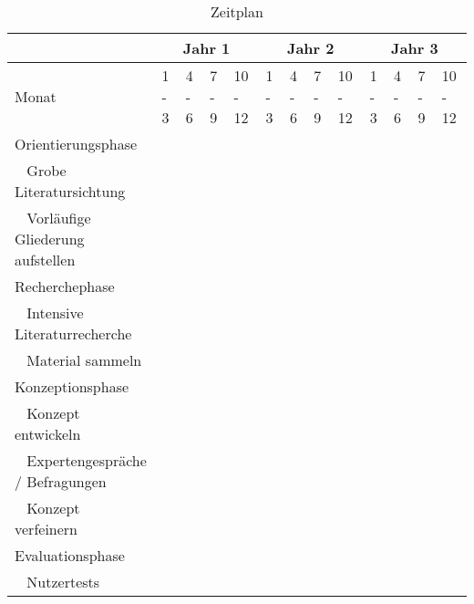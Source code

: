 \begin{landscape}
    \begin{table}
        \centering
        \caption{Zeitplan}
        \begin{tabular}{|l|l|l|l|l|l|l|l|l|l|l|l|l|}
        \hline
            & \multicolumn{4}{c|}{Jahr 1}  & \multicolumn{4}{c|}{Jahr 2} & \multicolumn{4}{c|}{Jahr 3} \\ \hline
            Monat  & 1 - 3 & 4 - 6 & 7 - 9 & 10 - 12 & 1 - 3 & 4 - 6 & 7 - 9 & 10 - 12 & 1 - 3 & 4 - 6 & 7 - 9 & 10 - 12 \\ \hline
            \cellcolor{yellow!75}Orientierungsphase & \cellcolor{yellow!75} & \cellcolor{yellow!75} &  &  &  &  &  &  &  &  &  &  \\ \hline
            ~ Grobe Literatursichtung  & \cellcolor{yellow!35} &  &  &  &  &  &  &  &  &  &  &  \\ \hline
            ~ Vorläufige Gliederung aufstellen  & \cellcolor{yellow!35} & \cellcolor{yellow!35} &  &  &  &  &  &  &  &  &  &  \\ \hline
            \cellcolor{yellow!75}Recherchephase  &  & \cellcolor{yellow!75} & \cellcolor{yellow!75} & \cellcolor{yellow!75} &  &  &  &  &  &  &  &  \\ \hline
            ~ Intensive Literaturrecherche  &  & \cellcolor{yellow!35} & \cellcolor{yellow!35} &  &  &  &  &  &  &  &  &  \\ \hline
            ~ Material sammeln  &  &  & \cellcolor{yellow!35} & \cellcolor{yellow!35}  &  &  &  &  &  &  &  &  \\ \hline
            \cellcolor{yellow!75}Konzeptionsphase  &  &  &  & \cellcolor{yellow!75} & \cellcolor{yellow!75} &  \cellcolor{yellow!75} &  &  &  &  &  &  \\ \hline
            ~ Konzept entwickeln  &  &  &  & \cellcolor{yellow!35} & \cellcolor{yellow!35} &  &  &  &  &  &  &  \\ \hline
            ~ Expertengespräche / Befragungen  &  &  &  &  & \cellcolor{yellow!35} & \cellcolor{yellow!35} &  &  &  &  &  &  \\ \hline
            ~ Konzept verfeinern  &  &  &  &  &  &\cellcolor{yellow!35}  &  &  &  &  &  &  \\ \hline
            \cellcolor{yellow!75}Evaluationsphase  &  &  &  &  &  &  &  \cellcolor{yellow!75} &  \cellcolor{yellow!75} & \cellcolor{yellow!75} &  &  &  \\ \hline
            ~ Nutzertests  &  &  &  &  &  &  & \cellcolor{yellow!35} & \cellcolor{yellow!35} &  &  &  &  \\ \hline

\end{tabular}
\end{table}
\end{landscape}
